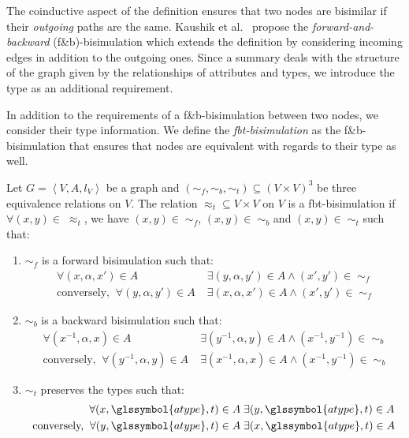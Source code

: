 The coinductive aspect of the definition ensures that two nodes are bisimilar if their \emph{outgoing} paths are the same. Kaushik et al.~\cite{kaushik:2002:cib} propose the \emph{forward-and-backward} (f\&b)-bisimulation which extends the definition by considering incoming edges in addition to the outgoing ones. Since a summary deals with the structure of the graph given by the relationships of attributes and types, we introduce the type as an additional requirement.

In addition to the requirements of a f\&b-bisimulation between two nodes, we consider their type information. We define the \emph{fbt-bisimulation} as the f\&b-bisimulation that ensures that nodes are equivalent with regards to their type as well.

\begin{definition}
Let $G=\left\langle V, A, l_V \right\rangle$ be a graph and $(\sim_f, \sim_b, \sim_t) \subseteq (V \times V)^3$ be three equivalence relations on $V$.
The relation $\approx_t \subseteq V \times V$ on $V$ is a fbt-bisimulation if $\forall (x,y) \in\; \approx_t$, we have $(x,y) \in\; \sim_f$, $(x,y) \in\; \sim_b$ and $(x,y) \in\; \sim_t$ such that:
\begin{enumerate}
\item $\sim_f$ is a forward bisimulation such that:
$$
\begin{aligned}
\forall (x, \alpha, x') \in A&\; \exists (y, \alpha, y') \in A \wedge (x',y') \in\; \sim_f \\
\text{conversely,}\;\; \forall (y, \alpha, y') \in A&\; \exists (x, \alpha, x') \in A \wedge (x',y') \in\; \sim_f
\end{aligned}
$$

\item $\sim_b$ is a backward bisimulation such that:
$$
\begin{aligned}
\forall (x^{-1}, \alpha, x) \in A&\; \exists (y^{-1}, \alpha, y) \in A \wedge (x^{-1}, y^{-1}) \in\; \sim_b \\
\text{conversely,}\;\; \forall (y^{-1}, \alpha, y) \in A&\; \exists (x^{-1}, \alpha, x) \in A \wedge (x^{-1}, y^{-1}) \in\; \sim_b
\end{aligned}
$$

\item $\sim_t$ preserves the types such that:
$$
\begin{aligned}
\forall (x, \glssymbol{atype}, t) \in A&\; \exists (y, \glssymbol{atype}, t) \in A \\
\text{conversely,}\;\; \forall (y, \glssymbol{atype}, t) \in A&\; \exists (x, \glssymbol{atype}, t) \in A
\end{aligned}
$$

\end{enumerate}
\end{definition}

